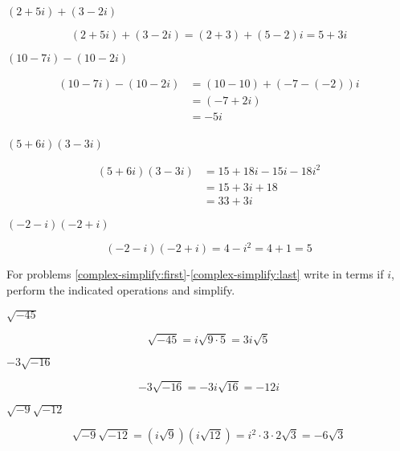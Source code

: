 \documentclass[fleqn,addpoints]{exam}
\begin{document}
\begin{questions}

\question[3] \( (2 + 5i) + (3 - 2i) \)
\label{complex-arithmetic:first}
\begin{solution}[3 cm]
\[
  (2 + 5i) + (3 - 2i) = (2+3) + (5-2)i = 5+3i
\]
\end{solution}

\question[3] \( (10 -7i) - (10 - 2i) \)
\begin{solution}[3 cm]
\begin{align*}
  (10 -7i) - (10 - 2i) &= (10-10) + (-7 - (-2))i \\
  &= (-7+2i) \\
  &= -5i \\
\end{align*}

\end{solution}

\question[5] \( (5 + 6i) (3 - 3i) \)
\begin{solution}[4 cm]
\begin{align*}
  (5 + 6i) (3 - 3i) &= 15 + 18i - 15i - 18i^2 \\
  & = 15 + 3i + 18 \\
  & = 33+3i
\end{align*}

\end{solution}

\question[5] \( (-2 - i) (-2 + i) \)
\label{complex-arithmetic:last}
\begin{solution}[4 cm]
\[
  (-2 - i) (-2 + i) = 4 - i^2 = 4+1 = 5
\]
\end{solution}

For problems \ref{complex-simplify:first}-\ref{complex-simplify:last} write in terms if $i$, perform the indicated
operations and simplify.

\question[3] \( \sqrt{-45} \)
\label{complex-simplify:first}
\begin{solution}[3 cm]
\[
  \sqrt{-45} = i \sqrt{9 \cdot 5} = 3i \sqrt{5}
\]
\end{solution}

\question[3] \( -3 \sqrt{-16} \)
\begin{solution}[3 cm]
\[
  -3 \sqrt{-16} = -3i \sqrt{16} = -12i
\]
\end{solution}

\question[5] \( \sqrt{-9} \sqrt{-12} \)
\begin{solution}[4 cm]
\[
  \sqrt{-9} \sqrt{-12} = (i \sqrt{9})(i \sqrt{12}) = i^2 \cdot 3 \cdot 2\sqrt{3} = -6 \sqrt{3}
\]
\end{solution}


\end{questions}
\end{document}
